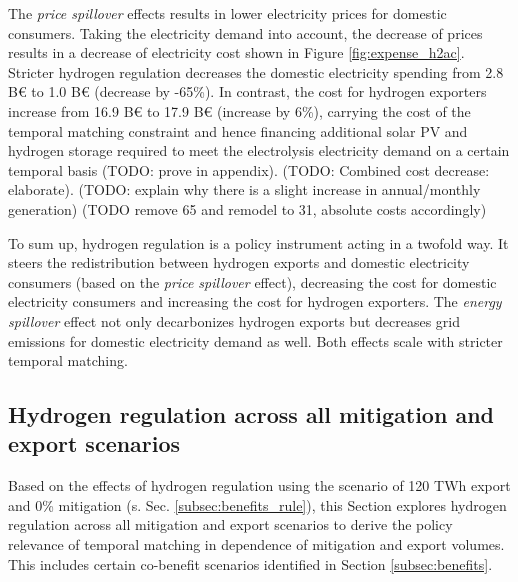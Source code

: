 The \textit{price spillover} effects results in lower electricity prices for domestic consumers. Taking the electricity demand into account, the decrease of prices results in a decrease of electricity cost shown in 
Figure \ref{fig:expense_h2ac}. Stricter hydrogen regulation decreases the domestic electricity spending from 2.8 B€ to 1.0 B€ (decrease by -65\%). In contrast, the cost for hydrogen exporters increase from 16.9 B€ to 17.9 B€ (increase by 6\%), carrying the cost of the temporal matching constraint and hence financing additional solar PV and hydrogen storage required to meet the electrolysis electricity demand on a certain temporal basis (TODO: prove in appendix). (TODO: Combined cost decrease: elaborate). (TODO: explain why there is a slight increase in annual/monthly generation) (TODO remove 65 and remodel to 31, absolute costs accordingly)


To sum up, hydrogen regulation is a policy instrument acting in a twofold way. It steers the redistribution between hydrogen exports and domestic electricity consumers (based on the \textit{price spillover} effect), decreasing the cost for domestic electricity consumers and increasing the cost for hydrogen exporters. The \textit{energy spillover} effect not only decarbonizes hydrogen exports but decreases grid emissions for  domestic electricity demand as well. Both effects scale with stricter temporal matching.





\subsection{Hydrogen regulation across all mitigation and export scenarios}
\label{subsec:rule_all}

Based on the effects of hydrogen regulation using the scenario of 120 TWh export and 0\% mitigation (s. Sec. \ref{subsec:benefits_rule}), this Section explores hydrogen regulation across all mitigation and export scenarios to derive the policy relevance of temporal matching in dependence of mitigation and export volumes. This includes certain co-benefit scenarios identified in Section \ref{subsec:benefits}.


